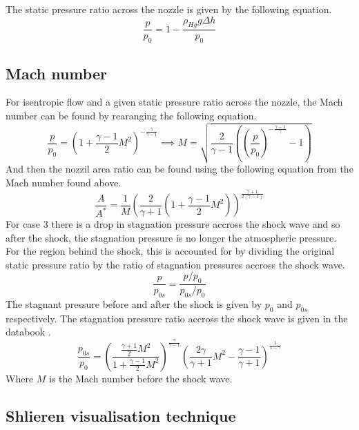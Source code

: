 \documentclass{article}
\begin{document}
The static pressure ratio across the nozzle is given by the following equation.
\begin{equation}
    \frac{p}{p_0} = 1 - \frac{\rho_{Hg} g \Delta h}{p_0}
\end{equation}

\subsection{Mach number}
For isentropic flow and a given static pressure ratio across the nozzle, the Mach number can be found by rearanging the following equation.
\begin{equation}
    \frac{p}{p_0} = \left( 1 + \frac{\gamma - 1}{2}M^2\right) ^ {-\frac{\gamma}{\gamma-1}} \implies M = \sqrt{\frac{2}{\gamma-1} \left( \left( \frac{p}{p_0}\right) ^ {-\frac{\gamma-1}{\gamma}} - 1\right)}
\end{equation}
And then the nozzil area ratio can be found using the following equation from the Mach number found above.
\begin{equation}
    \frac{A}{A^*} = \frac{1}{M} \left( \frac{2}{\gamma+1} \left( 1 + \frac{\gamma-1}{2}M^2\right) \right) ^ {\frac{\gamma+1}{2(\gamma-1)}}
\end{equation}
For case 3 there is a drop in stagnation pressure accross the shock wave and so after the shock, the stagnation pressure is no longer the atmospheric pressure.
For the region behind the shock, this is accounted for by dividing the original static pressure ratio by the ratio of stagnation pressures accross the shock wave.
\begin{equation}
    \frac{p}{p_{0s}} = \frac{p/p_0}{p_{0s}/p_0}
\end{equation}
The stagnant pressure before and after the shock is given by $p_0$ and $p_{0s}$ respectively.
The stagnation pressure ratio accross the shock wave is given in the databook \cite{data_book}.
\begin{equation}
    \frac{p_{0s}}{p_0} = \left( \frac{\frac{\gamma+1}{2}M^2}{1 + \frac{\gamma-1}{2}M^2}\right) ^ \frac{\gamma}{\gamma-1} \left( \frac{2\gamma}{\gamma+1} M^2 - \frac{\gamma-1}{\gamma+1}\right) ^ \frac{1}{1 - \gamma}
\end{equation}
Where $M$ is the Mach number before the shock wave.

\subsection{Shlieren visualisation technique}
\end{document}
